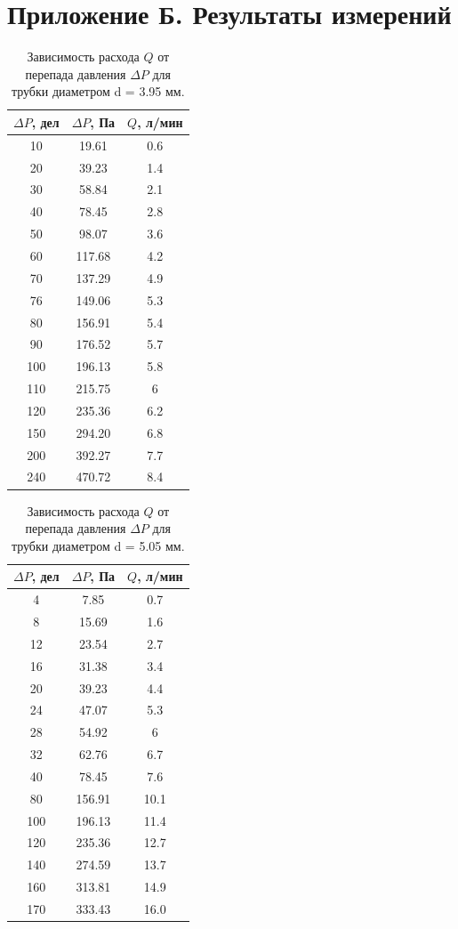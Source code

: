 \section{Приложение Б. Результаты измерений}

\begin{table}[h]
\begin{tabular}{|c|c|c|}
\hline
{$\Delta P$, дел} & {$\Delta P$, Па} & {$Q$, л/мин} \\
\hline
10 & 19.61 & 0.6 \\ \hline
20 & 39.23 & 1.4 \\ \hline
30 & 58.84 & 2.1 \\ \hline
40 & 78.45 & 2.8 \\ \hline
50 & 98.07 & 3.6 \\ \hline
60 & 117.68 & 4.2 \\ \hline
70 & 137.29 & 4.9 \\ \hline
76 & 149.06 & 5.3 \\ \hline
80 & 156.91 & 5.4 \\ \hline
90 & 176.52 & 5.7 \\ \hline
100 & 196.13 & 5.8 \\ \hline
110 & 215.75 & 6 \\ \hline
120 & 235.36 & 6.2 \\ \hline
150 & 294.20 & 6.8 \\ \hline
200 & 392.27 & 7.7 \\ \hline
240 & 470.72 & 8.4 \\ \hline
\end{tabular}
\caption{
\centering Зависимость расхода $Q$ от перепада давления $\Delta P$ для трубки диаметром d = 3.95 мм. 
}
\end{table}

\begin{table}[h]
\begin{tabular}{|c|c|c|}
 \hline
{$\Delta P$, дел} & {$\Delta P$, Па} & {$Q$, л/мин} \\
 \hline
4 & 7.85 & 0.7 \\  \hline
8 & 15.69 & 1.6 \\ \hline
12 & 23.54 & 2.7 \\ \hline
16 & 31.38 & 3.4 \\ \hline
20 & 39.23 & 4.4 \\ \hline
24 & 47.07 & 5.3 \\ \hline
28 & 54.92 & 6 \\ \hline
32 & 62.76 & 6.7 \\ \hline
40 & 78.45 & 7.6 \\ \hline
80 & 156.91 & 10.1 \\ \hline
100 & 196.13 & 11.4 \\ \hline
120 & 235.36 & 12.7 \\ \hline
140 & 274.59 & 13.7 \\ \hline
160 & 313.81 & 14.9 \\ \hline
170 & 333.43 & 16.0 \\ \hline
\end{tabular}
\caption{
\centering Зависимость расхода $Q$ от перепада давления $\Delta P$ для трубки диаметром d = 5.05 мм. 
}
\end{table}